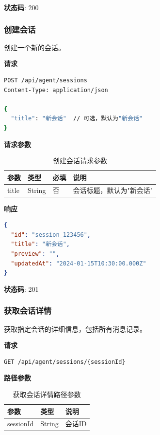 \documentclass[12pt,a4paper]{article}
\begin{document}
\textbf{状态码}: 200

\subsubsection{创建会话}

创建一个新的会话。

\textbf{请求}

\begin{lstlisting}[language=bash]
POST /api/agent/sessions
Content-Type: application/json

{
  "title": "新会话"  // 可选，默认为"新会话"
}
\end{lstlisting}

\textbf{请求参数}

\begin{table}[h]
  \centering
  \begin{tabular}{llll}
    \toprule
    参数 & 类型 & 必填 & 说明 \\
    \midrule
    title & String & 否 & 会话标题，默认为"新会话" \\
    \bottomrule
  \end{tabular}
  \caption{创建会话请求参数}
\end{table}

\textbf{响应}

\begin{lstlisting}[language=json]
{
  "id": "session_123456",
  "title": "新会话",
  "preview": "",
  "updatedAt": "2024-01-15T10:30:00.000Z"
}
\end{lstlisting}

\textbf{状态码}: 201

\subsubsection{获取会话详情}

获取指定会话的详细信息，包括所有消息记录。

\textbf{请求}

\begin{lstlisting}[language=bash]
GET /api/agent/sessions/{sessionId}
\end{lstlisting}

\textbf{路径参数}

\begin{table}[h]
  \centering
  \begin{tabular}{lll}
    \toprule
    参数 & 类型 & 说明 \\
    \midrule
    sessionId & String & 会话ID \\
    \bottomrule
  \end{tabular}
  \caption{获取会话详情路径参数}
\end{table}
\end{document}
